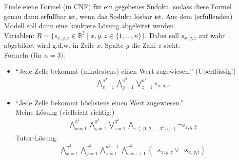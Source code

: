 \documentclass[12pt,a4paper]{article}
\begin{document}
\begin{aufgabe}
Finde eiene Formel (in CNF) für ein gegebenes Sudoku, sodass diese Formel genau dann erfüllbar ist, wenn das Soduku lösbar ist. Aus dem (erfüllenden) Modell soll dann eine konkrete Lösung abgeleitet werden.\\
Variablen: $R=\big\lbrace s_{x,y,z}\in\mathbb{B}^3\mid x,y,z\in\lbrace 1,\ldots,n\rbrace\big\rbrace$. Dabei soll $s_{x,y,z}$ auf wahr abgebildet wird g.d.w. in Zeile $x$, Spalte $y$ die Zahl $z$ steht.\\
Formeln (für $n=3$):
\begin{itemize}
\item ``Jede Zelle bekommt (mindestens) einen Wert zugewiesen.'' (Überflüssig!)
\begin{align*}
\bigwedge\limits_{x=1}^{n^2}\bigwedge\limits_{y=1}^{n^2}\bigvee\limits_{z=1}^{n^2} s_{x,y,z}
\end{align*}
\item ``Jede Zelle bekommt höchstens einen Wert zugewiesen.''\\
Meine Lösung (vielleicht richtig:)
\begin{align*}
\bigwedge\limits_{x=1}^{3^2}\bigwedge\limits_{y=1}^{3^2}\bigvee\limits_{z=1}^{3^2}\bigwedge\limits_{\hat{z}\in\lbrace1,2,\ldots,3^2\rbrace\setminus\lbrace z\rbrace} \neg s_{x,y,\hat{z}}
\end{align*}
Tutor-Lösung:
\begin{align*}
\bigwedge\limits_{x=1}^{n^2}
\bigwedge\limits_{y=1}^{n^2}
\bigwedge\limits_{z=1}^{n^2-1}
\bigwedge\limits_{i=z+1}^{n^2}
(\neg s_{x,y,z}\vee\neg s_{x,y,i})
\end{align*}


\end{itemize}
\end{aufgabe}
\end{document}
